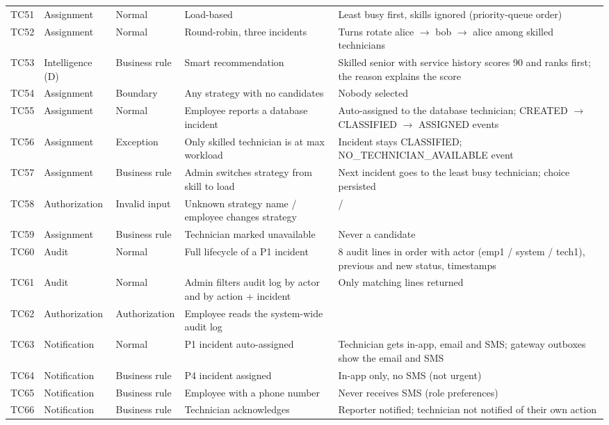 \begin{longtable}{@{}L{1.0cm}L{1.85cm}L{2.15cm}L{4.05cm}L{5.45cm}@{}}
TC51 & Assignment & Normal & Load-based & Least busy first, skills ignored (priority-queue order) \\
TC52 & Assignment & Normal & Round-robin, three incidents & Turns rotate alice $\rightarrow$ bob $\rightarrow$ alice among skilled technicians \\
TC53 & Intelligence (D) & Business rule & Smart recommendation & Skilled senior with service history scores 90 and ranks first; the reason explains the score \\
TC54 & Assignment & Boundary & Any strategy with no candidates & Nobody selected \\
TC55 & Assignment & Normal & Employee reports a database incident & Auto-assigned to the database technician; CREATED $\rightarrow$ CLASSIFIED $\rightarrow$ ASSIGNED events \\
TC56 & Assignment & Exception & Only skilled technician is at max workload & Incident stays CLASSIFIED; NO\_TECHNICIAN\_AVAILABLE event \\
TC57 & Assignment & Business rule & Admin switches strategy from skill to load & Next incident goes to the least busy technician; choice persisted \\
TC58 & Authorization & Invalid input & Unknown strategy name / employee changes strategy &  /  \\
TC59 & Assignment & Business rule & Technician marked unavailable & Never a candidate \\
TC60 & Audit & Normal & Full lifecycle of a P1 incident & 8 audit lines in order with actor (emp1 / system / tech1), previous and new status, timestamps \\
TC61 & Audit & Normal & Admin filters audit log by actor and by action + incident & Only matching lines returned \\
TC62 & Authorization & Authorization & Employee reads the system-wide audit log &  \\
TC63 & Notification & Normal & P1 incident auto-assigned & Technician gets in-app, email and SMS; gateway outboxes show the email and SMS \\
TC64 & Notification & Business rule & P4 incident assigned & In-app only, no SMS (not urgent) \\
TC65 & Notification & Business rule & Employee with a phone number & Never receives SMS (role preferences) \\
TC66 & Notification & Business rule & Technician acknowledges & Reporter notified; technician not notified of their own action \\

\end{longtable}
